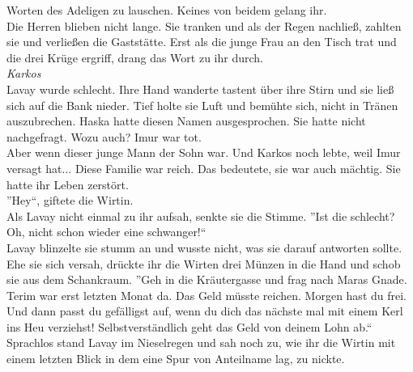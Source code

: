 Worten des Adeligen zu lauschen. Keines von beidem gelang ihr.\\
Die Herren blieben nicht lange. Sie tranken und als der Regen nachließ, zahlten sie und verließen 
die Gaststätte. Erst als die junge Frau an den Tisch trat und die drei Krüge ergriff, drang das 
Wort zu ihr durch.\\
\textit{Karkos}\\
Lavay wurde schlecht. Ihre Hand wanderte tastent über ihre Stirn und sie ließ sich auf die Bank 
nieder. Tief holte sie Luft und bemühte sich, nicht in Tränen auszubrechen. Haska hatte diesen 
Namen ausgesprochen. Sie hatte nicht nachgefragt. Wozu auch? Imur war tot.\\
Aber wenn dieser junge Mann der Sohn war. Und Karkos noch lebte, weil Imur versagt hat... Diese 
Familie war reich. Das bedeutete, sie war auch mächtig. Sie hatte ihr Leben zerstört.\\
''Hey``, giftete die Wirtin.\\
Als Lavay nicht einmal zu ihr aufsah, senkte sie die Stimme. ''Ist die schlecht? Oh, nicht schon 
wieder eine schwanger!``\\
Lavay blinzelte sie stumm an und wusste nicht, was sie darauf antworten sollte. Ehe sie sich 
versah, drückte ihr die Wirten drei Münzen in die Hand und schob sie aus dem Schankraum. ''Geh in 
die Kräutergasse und frag nach Maras Gnade. Terim war erst letzten Monat da. Das Geld müsste 
reichen. Morgen hast du frei. Und dann passt du gefälligst auf, wenn du dich das nächste mal mit 
einem Kerl ins Heu verziehst! Selbstverständlich geht das Geld von deinem Lohn ab.``\\
Sprachlos stand Lavay im Nieselregen und sah noch zu, wie ihr die Wirtin mit einem letzten Blick in 
dem eine Spur von Anteilname lag, zu nickte. 

